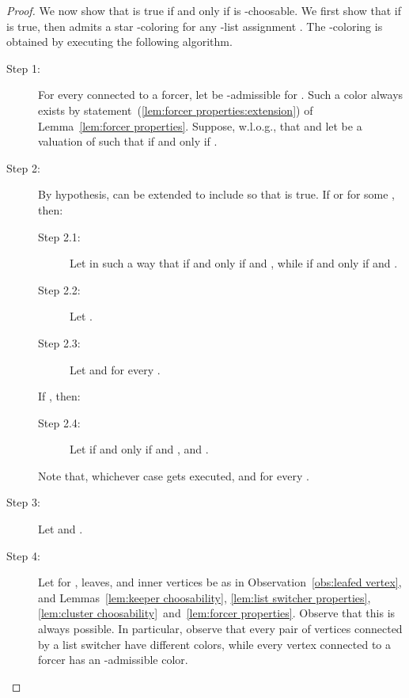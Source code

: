 \documentclass[a4paper, 11pt, oneside]{article}
\begin{document}
\begin{proof}
  We now show that  is true if and only if  is -choosable.  We first show that if  is true, then  admits a star -coloring  for any -list assignment .  The -coloring  is obtained by executing the following algorithm.
  \begin{description}
    \item[Step 1:] For every  connected to a forcer, let  be -admissible for .  Such a color always exists by statement~(\ref{lem:forcer properties:extension}) of Lemma~\ref{lem:forcer properties}.  Suppose, w.l.o.g., that  and let  be a valuation of  such that  if and only if .  
    
    \item[Step 2:] By hypothesis,  can be extended to include  so that  is true.  If  or  for some , then:
    \begin{description}
      \item [Step 2.1:] Let  in such a way that  if and only if  and , while  if and only if  and .
      \item [Step 2.2:] Let .
      \item [Step 2.3:] Let  and  for every .
    \end{description}
    If , then:
    \begin{description}
      \item [Step 2.4:] Let  if and only if  and , and .
    \end{description}
    Note that, whichever case gets executed,  and  for every .
    
    \item[Step 3:] Let  and .  
    
    \item[Step 4:] Let  for , leaves, and inner vertices be as in Observation~\ref{obs:leafed vertex}, and Lemmas~\ref{lem:keeper choosability}, \ref{lem:list switcher properties}, \ref{lem:cluster choosability}~and~\ref{lem:forcer properties}.  Observe that this is always possible.  In particular, observe that every pair of vertices connected by a list switcher have different colors, while every vertex connected to a forcer has an -admissible color.
  \end{description}


\end{proof}
\end{document}
